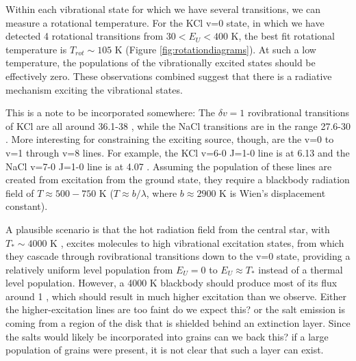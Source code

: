 \documentclass[twocolumn]{aastex62}
\begin{document}
Within each vibrational state for which we have several transitions, we can
measure a rotational temperature.  For the KCl v=0 state, in which we have
detected 4 rotational transitions from $30 < E_U < 400$ K, the best fit
rotational temperature is $T_{rot}\sim105$ K (Figure
\ref{fig:rotationdiagrams}).  At such a low temperature, the populations of the
vibrationally excited states should be effectively zero.  These observations
combined suggest that there is a radiative mechanism exciting the vibrational
states.



{\color{red} This is a note to be incorporated somewhere:}
The $\delta v=1$ rovibrational transitions of KCl are all around 36.1-38 \um,
while the NaCl transitions are in the range 27.6-30 \um.
More interesting for constraining the exciting source, though, are the v=0 to
v=1 through v=8 lines.
For example, the KCl v=6-0 J=1-0 line is at 6.13 \um and the NaCl v=7-0 J=1-0
line is at 4.07 \um.  Assuming the population of these lines are created
from excitation from the ground state, they require a blackbody radiation field
of $T\approx500-750$ K ($T\approx b / \lambda$, where $b\approx2900$ \um K is
Wien's displacement constant).


A plausible scenario is that the hot radiation field from the central star,
with $T_*\sim4000$ K \citep{Testi2010a}, excites molecules to high vibrational
excitation states, from which they cascade through rovibrational transitions
down to the v=0 state, providing a relatively uniform level population
from $E_U=0$ to $E_U\approx T_*$ instead of a thermal level population.
However, a 4000 K blackbody should produce most of its flux around 1 \um,
which should result in much higher excitation than we observe.  Either
the higher-excitation lines are too faint {\color{red} do we expect this?}
or the salt emission is coming from a region of the disk that is shielded
behind an extinction layer.   Since the salts would likely be incorporated into
grains {\color{red}can we back this?} if a large population of grains
were present, it is not clear that such a layer can exist.
\end{document}
